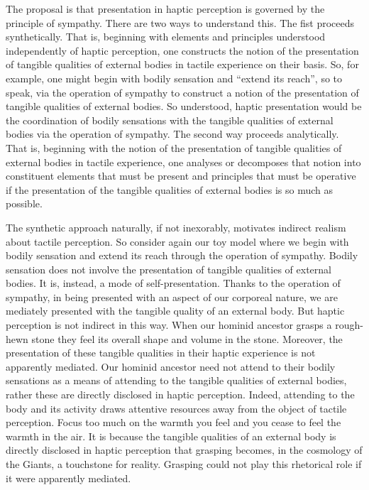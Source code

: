 \documentclass[12pt]{article}
\begin{document}
The proposal is that presentation in haptic perception is governed by the principle of sympathy. There are two ways to understand this. The fist proceeds synthetically. That is, beginning with elements and principles understood independently of haptic perception, one constructs the notion of the presentation of tangible qualities of external bodies in tactile experience on their basis. So, for example, one might begin with bodily sensation and ``extend its reach'', so to speak, via the operation of sympathy to construct a notion of the presentation of tangible qualities of external bodies. So understood, haptic presentation would be the coordination of bodily sensations with the tangible qualities of external bodies via the operation of sympathy. The second way proceeds analytically. That is, beginning with the notion of the presentation of tangible qualities of external bodies in tactile experience, one analyses or decomposes that notion into constituent elements that must be present and principles that must be operative if the presentation of the tangible qualities of external bodies is so much as possible. 

The synthetic approach naturally, if not inexorably, motivates indirect realism about tactile perception. So consider again our toy model where we begin with bodily sensation and extend its reach through the operation of sympathy. Bodily sensation does not involve the presentation of tangible qualities of external bodies. It is, instead, a mode of self-presentation. Thanks to the operation of sympathy, in being presented with an aspect of our corporeal nature, we are mediately presented with the tangible quality of an external body. But haptic perception is not indirect in this way. When our hominid ancestor grasps a rough-hewn stone they feel its overall shape and volume in the stone. Moreover, the presentation of these tangible qualities in their haptic experience is not apparently mediated. Our hominid ancestor need not attend to their bodily sensations as a means of attending to the tangible qualities of external bodies, rather these are directly disclosed in haptic perception. Indeed, attending to the body and its activity draws attentive resources away from the object of tactile perception. Focus too much on the warmth you feel and you cease to feel the warmth in the air. It is because the tangible qualities of an external body is directly disclosed in haptic perception that grasping becomes, in the cosmology of the Giants, a touchstone for reality. Grasping could not play this rhetorical role if it were apparently mediated.
\end{document}

